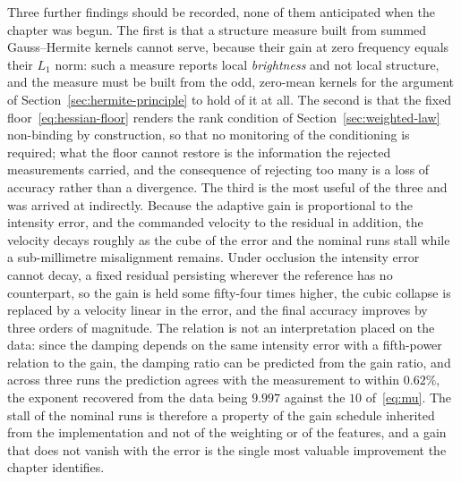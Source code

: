 Three further findings should be recorded, none of them anticipated when the
chapter was begun. The first is that a structure measure built from summed
Gauss--Hermite kernels cannot serve, because their gain at zero frequency
equals their $L_{1}$ norm: such a measure reports local \emph{brightness} and
not local structure, and the measure must be built from the odd, zero-mean
kernels for the argument of Section~\ref{sec:hermite-principle} to hold of it
at all. The second is that the fixed floor~\eqref{eq:hessian-floor} renders
the rank condition of Section~\ref{sec:weighted-law} non-binding by
construction, so that no monitoring of the conditioning is required; what the
floor cannot restore is the information the rejected measurements carried, and
the consequence of rejecting too many is a loss of accuracy rather than a
divergence. The third is the most useful of the three and was arrived at
indirectly. Because the adaptive gain is proportional to the intensity error,
and the commanded velocity to the residual in addition, the velocity decays
roughly as the cube of the error and the nominal runs stall while a
sub-millimetre misalignment remains. Under occlusion the intensity error
cannot decay, a fixed residual persisting wherever the reference has no
counterpart, so the gain is held some fifty-four times higher, the cubic
collapse is replaced by a velocity linear in the error, and the final accuracy
improves by three orders of magnitude. The relation is not an interpretation
placed on the data: since the damping depends on the same intensity error with
a fifth-power relation to the gain, the damping ratio can be predicted from
the gain ratio, and across three runs the prediction agrees with the
measurement to within $0.62\%$, the exponent recovered from the data being
$9.997$ against the $10$ of~\eqref{eq:mu}. The stall of the nominal runs is
therefore a property of the gain schedule inherited from the implementation
and not of the weighting or of the features, and a gain that does not vanish
with the error is the single most valuable improvement the chapter identifies.

